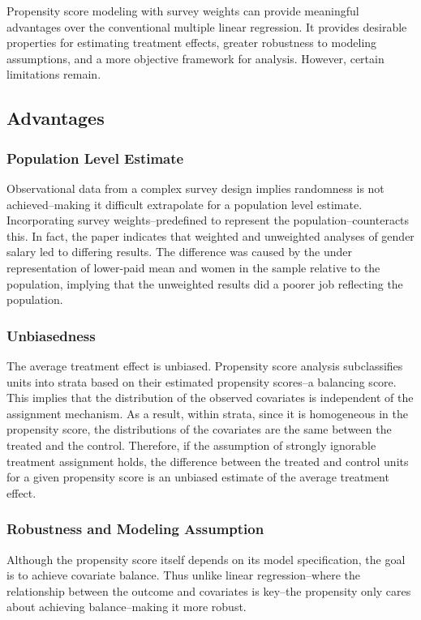 \documentclass[12pt]{article}
\begin{document}
Propensity score modeling with survey weights can provide meaningful advantages over the conventional multiple linear regression. It provides desirable properties for estimating treatment effects, greater robustness to modeling assumptions, and a more objective framework for analysis. However, certain limitations remain.

\subsection{Advantages}

\subsubsection{Population Level Estimate}

Observational data from a complex survey design implies randomness is not achieved--making it difficult extrapolate for a population level estimate. Incorporating survey weights--predefined to represent the population--counteracts this. In fact, the paper indicates that weighted and unweighted analyses of gender salary led to differing results. The difference was caused by the under representation of lower-paid mean and women in the sample relative to the population, implying that the unweighted results did a poorer job reflecting the population.

\subsubsection{Unbiasedness}

The average treatment effect is unbiased. Propensity score analysis subclassifies units into strata based on their estimated propensity scores--a balancing score. This implies that the distribution of the observed covariates is independent of the assignment mechanism. As a result, within strata, since it is homogeneous in the propensity score, the distributions of the covariates are the same between the treated and the control. Therefore, if the assumption of strongly ignorable treatment assignment holds, the difference between the treated and control units for a given propensity score is an unbiased estimate of the average treatment effect.

\subsubsection{Robustness and Modeling Assumption}

Although the propensity score itself depends on its model specification, the goal is to achieve covariate balance. Thus unlike linear regression--where the relationship between the outcome and covariates is key--the propensity only cares about achieving balance--making it more robust.
\end{document}
